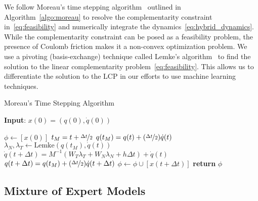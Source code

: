 We follow Moreau's time stepping algorithm~\cite{glocker2005formulation}
outlined in Algorithm~\eqref{algo:moreau} to resolve the complementarity
constraint in~\eqref{eq:feasibility} and numerically integrate the
dynamics~\eqref{eq:hybrid_dynamics}. While the complementarity constraint can be
posed as a feasibility problem, the presence of Coulomb friction makes it a
non-convex optimization problem. We use a pivoting (basis-exchange) technique
called Lemke's algorithm~\cite{acary2008numerical} to find the solution to the
linear complementarity problem~\eqref{eq:feasibility}. This allows us to
differentiate the solution to the LCP in our efforts to use machine learning
techniques.

\begin{algorithm}[H]
    \caption{Moreau's Time Stepping Algorithm}
    \label{algo:moreau}
    \small
    \hspace*{\algorithmicindent} \textbf{Input}: $x(0) = (q(0), \dot{q}(0))$
    \begin{algorithmic}[1]
      \State $\phi \leftarrow  [x(0)]$ 
            \State $t_M = t + \nicefrac{\Delta t}{2}$
            \State $q(t_M) = q(t) +  (\nicefrac{\Delta t}{2}) \dot{q}(t) $
            \State $\lambda_N, \lambda_T \leftarrow \text{Lemke}(q(t_M), \dot{q}(t))$ 
            \State $\dot{q}(t+\Delta t) = M^{-1}(W_T \lambda_T + W_N \lambda_N + h\Delta t) + \dot{q}(t)$
            \State $q(t + \Delta t) =  q(t_M) +  (\nicefrac{\Delta t}{2})\dot{q}(t+\Delta t)$
            \State $\phi \leftarrow \phi \cup [x(t+\Delta t)]$
          \EndFor
        \State \textbf{return} $\phi$
    \end{algorithmic}
\end{algorithm}


\subsection{Mixture of Expert Models}
\label{ssec:mixture_of_experts}

